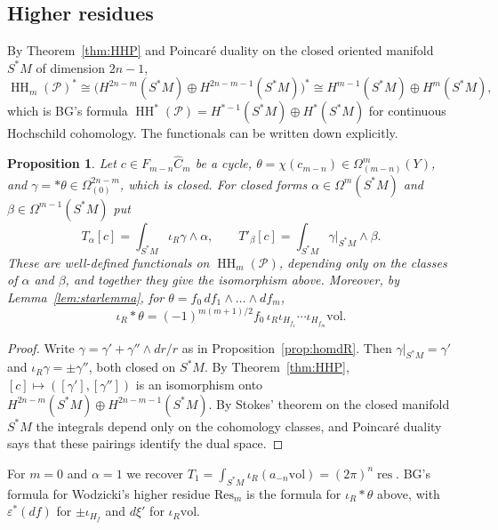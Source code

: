 \documentclass[11pt,oneside,reqno]{article}
\DeclareMathOperator{\HH}{HH}
\DeclareMathOperator{\res}{res}
\newcommand{\cP}{\mathcal P}
\newcommand{\Om}{\Omega}
\newcommand{\eps}{\varepsilon}
\newcommand{\vol}{\mathrm{vol}}
\newcommand{\Chat}{\widehat C}
\theoremstyle{plain}
\newtheorem{proposition}[theorem]{Proposition}
\theoremstyle{definition}
\theoremstyle{remark}
\begin{document}
\subsection{Higher residues}\label{subsec:higher}
By Theorem~\ref{thm:HHP} and Poincaré duality on the closed oriented manifold
\(S^*M\) of dimension \(2n-1\),
\[
 \HH_m(\cP)^*\cong\bigl(H^{2n-m}(S^*M)\oplus H^{2n-m-1}(S^*M)\bigr)^*\cong H^{m-1}(S^*M)\oplus H^m(S^*M),
\]
which is BG's formula \(\HH^*(\cP)=H^{*-1}(S^*M)\oplus H^*(S^*M)\) for continuous Hochschild
cohomology. The functionals can be written down explicitly.

\begin{proposition}\label{prop:higher}
Let \(c\in F_{m-n}\Chat_m\) be a cycle, \(\theta=\chi(c_{m-n})\in\Om^m_{(m-n)}(Y)\), and
\(\gamma=*\theta\in\Om^{2n-m}_{(0)}\), which is closed. For closed forms \(\alpha\in\Om^m(S^*M)\) and
\(\beta\in\Om^{m-1}(S^*M)\) put
\[
 T_\alpha[c]=\int_{S^*M}\iota_R\gamma\wedge\alpha,\qquad T'_\beta[c]=\int_{S^*M}\gamma|_{S^*M}\wedge\beta .
\]
These are well-defined functionals on \(\HH_m(\cP)\), depending only on the classes of \(\alpha\)
and \(\beta\), and together they give the isomorphism above. Moreover, by
Lemma~\ref{lem:starlemma}, for \(\theta=f_0\,df_1\wedge\dots\wedge df_m\),
\[
 \iota_R*\theta=(-1)^{m(m+1)/2}f_0\,\iota_R\iota_{H_{f_1}}\cdots\iota_{H_{f_m}}\vol .
\]
\end{proposition}

\begin{proof}
Write \(\gamma=\gamma'+\gamma''\wedge dr/r\) as in Proposition~\ref{prop:homdR}. Then
\(\gamma|_{S^*M}=\gamma'\) and \(\iota_R\gamma=\pm\gamma''\), both closed on \(S^*M\). By
Theorem~\ref{thm:HHP}, \([c]\mapsto([\gamma'],[\gamma''])\) is an isomorphism onto
\(H^{2n-m}(S^*M)\oplus H^{2n-m-1}(S^*M)\). By Stokes' theorem on the closed manifold
\(S^*M\) the integrals depend only on the cohomology classes, and Poincaré duality says
that these pairings identify the dual space.
\end{proof}

For \(m=0\) and \(\alpha=1\) we recover \(T_1=\int_{S^*M}\iota_R(a_{-n}\vol)=(2\pi)^n\res\). BG's
formula for Wodzicki's higher residue \(\mathrm{Res}_m\) is the formula for \(\iota_R*\theta\) above,
with \(\eps^*(df)\) for \(\pm\iota_{H_f}\) and \(d\xi'\) for \(\iota_R\vol\).
\end{document}
